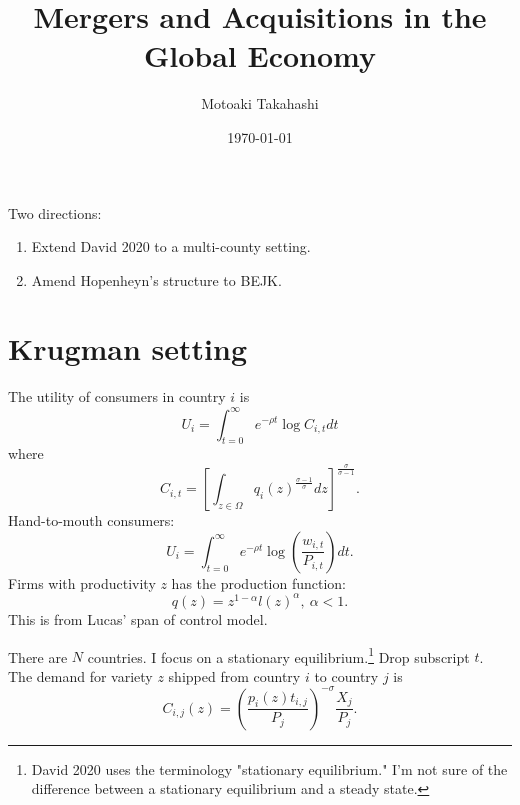 \documentclass[12pt,letterpaper]{article}
\begin{document}
\title{Mergers and Acquisitions in the Global Economy}

\author{
  Motoaki Takahashi
}

\date{\today}
\maketitle
\begin{abstract}

\end{abstract}


Two directions:
\begin{enumerate}
    \item Extend David 2020 to a multi-county setting.
    \item Amend Hopenheyn's structure to BEJK.
\end{enumerate}

\section{Krugman setting}
The utility of consumers in country $i$ is
\begin{equation}
    U_{i}=\int_{t=0}^{\infty}e^{-\rho t}\log C_{i,t}dt
\end{equation}
where
\begin{equation}
    C_{i,t}=\left[\int_{z \in \Omega}q_{i}(z)^{\frac{\sigma-1}{\sigma}}dz \right]^{\frac{\sigma}{\sigma-1}}.
\end{equation}
Hand-to-mouth consumers:
\begin{equation}
    U_{i}=\int_{t=0}^{\infty}e^{-\rho t}\log \left(\frac{w_{i,t}}{P_{i,t}}\right) dt.   
\end{equation}
Firms with productivity $z$ has the production function:
\begin{equation}
    q(z)=z^{1-\alpha}l(z)^{\alpha},\ \alpha<1.
\end{equation}
This is from Lucas' span of control model.\par
There are $N$ countries. I focus on a stationary equilibrium.\footnote{David 2020 uses the terminology "stationary equilibrium." I'm not sure of the difference between a stationary equilibrium and a steady state.} Drop subscript $t$. The demand for variety $z$ shipped from country $i$ to country $j$ is
\begin{equation}
    C_{i,j}(z)=\left(\frac{p_{i}(z)t_{i,j}}{P_{j}} \right)^{-\sigma}\frac{X_{j}}{P_{j}}.
\end{equation}
\end{document}
